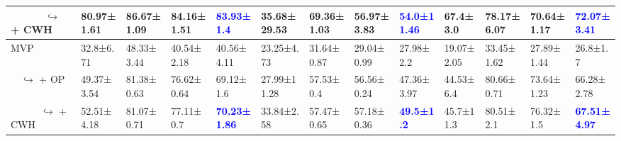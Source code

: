 \begin{table*}[ht]
{\begin{tabular}{l|llla|llla|llla}
\ \ \ \ \ \ $\hookrightarrow$ + CWH           & 80.97{\scriptsize±1.61} & 86.67{\scriptsize±1.09} & 84.16{\scriptsize±1.51} & \textbf{\textcolor{blue}{83.93{\scriptsize±1.4}}} & 35.68{\scriptsize±29.53} & 69.36{\scriptsize±1.03} & 56.97{\scriptsize±3.83} & \textbf{\textcolor{blue}{54.0{\scriptsize±11.46}}} & 67.4{\scriptsize±3.0} & 78.17{\scriptsize±6.07} & 70.64{\scriptsize±1.17} & \textbf{\textcolor{blue}{72.07{\scriptsize±3.41}}} \\
\hline
MVP                                          & 32.8{\scriptsize±6.71} & 48.33{\scriptsize±3.44} & 40.54{\scriptsize±2.18} & 40.56{\scriptsize±4.11} & 23.25{\scriptsize±4.73} & 31.64{\scriptsize±0.87} & 29.04{\scriptsize±0.99} & 27.98{\scriptsize±2.2} & 19.07{\scriptsize±2.05} & 33.45{\scriptsize±1.62} & 27.89{\scriptsize±1.44} & 26.8{\scriptsize±1.7} \\
\ \  $\hookrightarrow$ + OP                 & 49.37{\scriptsize±3.54} & 81.38{\scriptsize±0.63} & 76.62{\scriptsize±0.64} & 69.12{\scriptsize±1.6} & 27.99{\scriptsize±11.28} & 57.53{\scriptsize±0.4} & 56.56{\scriptsize±0.24} & 47.36{\scriptsize±3.97} & 44.53{\scriptsize±6.4} & 80.66{\scriptsize±0.71} & 73.64{\scriptsize±1.23} & 66.28{\scriptsize±2.78} \\
\ \ \ \ \ \ $\hookrightarrow$ + CWH          & 52.51{\scriptsize±4.18} & 81.07{\scriptsize±0.71} & 77.11{\scriptsize±0.7} & \textbf{\textcolor{blue}{70.23{\scriptsize±1.86}}} & 33.84{\scriptsize±2.58} & 57.47{\scriptsize±0.65} & 57.18{\scriptsize±0.36} & \textbf{\textcolor{blue}{49.5{\scriptsize±1.2}}} & 45.7{\scriptsize±11.3} & 80.51{\scriptsize±2.1} & 76.32{\scriptsize±1.5} & \textbf{\textcolor{blue}{67.51{\scriptsize±4.97}}} \\
\bottomrule
    \end{tabular}
    \label{tab:blurry_old}}
\end{table*}
